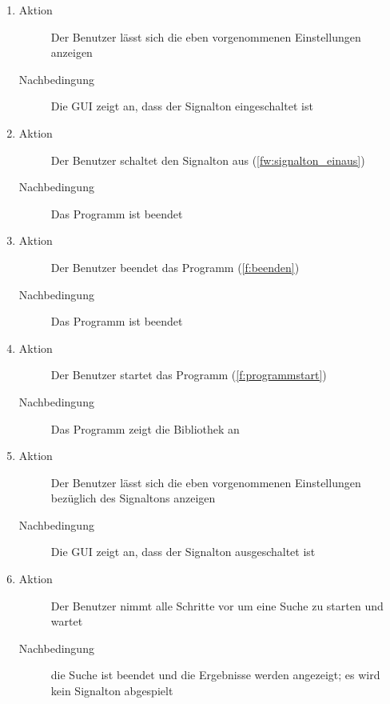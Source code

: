 \begin{enumerate} [label=\bfseries /TSW \arabic*0/, leftmargin=*]
\begin{enumerate}
		\item
		\begin{description}
			\item[Aktion] Der Benutzer lässt sich die eben vorgenommenen Einstellungen anzeigen
			\item[Nachbedingung] Die GUI zeigt an, dass der Signalton eingeschaltet ist
		\end{description}
		\item
		\begin{description}
			\item[Aktion] Der Benutzer schaltet den Signalton aus (\ref{fw:signalton_einaus})
			\item[Nachbedingung] Das Programm ist beendet
		\end{description}
		\item
		\begin{description}
			\item[Aktion] Der Benutzer beendet das Programm (\ref{f:beenden})
			\item[Nachbedingung] Das Programm ist beendet
		\end{description}
		\item
		\begin{description}
			\item[Aktion] Der Benutzer startet das Programm (\ref{f:programmstart})
			\item[Nachbedingung] Das Programm zeigt die Bibliothek an
		\end{description}
		\item
		\begin{description}
			\item[Aktion] Der Benutzer lässt sich die eben vorgenommenen Einstellungen bezüglich des Signaltons anzeigen
			\item[Nachbedingung] Die GUI zeigt an, dass der Signalton ausgeschaltet ist
		\end{description}
		\item
		\begin{description}
			\item[Aktion] Der Benutzer nimmt alle Schritte vor um eine Suche zu starten und wartet
			\item[Nachbedingung] die Suche ist beendet und die Ergebnisse werden angezeigt; es wird kein Signalton abgespielt
		\end{description}
	\end{enumerate}


\end{enumerate}
